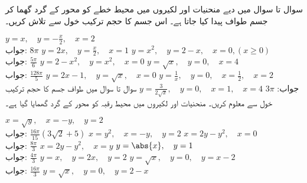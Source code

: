 سوال  تا سوال  میں دیے منحنیات اور لکیروں میں محیط خطے کو  محور کے گرد گھما کر جسم طواف پیدا کیا جاتا ہے۔ اس جسم کا حجم ترکیب خول سے تلاش کریں۔

$y=x,\quad y=-\tfrac{x}{2},\quad x=2$\\
جواب:\quad
$8\pi$
$y=2x,\quad y=\tfrac{x}{2},\quad x=1$
$y=x^2,\quad y=2-x,\quad x=0, (x\ge 0)$\\
جواب:\quad
$\tfrac{5\pi}{6}$
$y=2-x^2,\quad y=x^2,\quad x=0$
$y=\sqrt{x},\quad y=0,\quad x=4$\\
جواب:\quad
$\tfrac{128\pi}{5}$
$y=2x-1,\quad y=\sqrt{x},\quad x=0$
$y=\tfrac{1}{x},\quad y=0,\quad x=\tfrac{1}{2},\quad x=2$\\
جواب:\quad
$3\pi$
$y=\tfrac{3}{2\sqrt{x}},\quad y=0,\quad x=1,\quad x=4$
سوال  تا سوال  میں طواف جسم کا حجم ترکیب خول سے معلوم کریں۔ منحنیات اور لکیروں میں محیط رقبہ کو  محور کے گرد گھمایا گیا ہے۔

$x=\sqrt{y},\quad x=-y,\quad y=2$\\
جواب:\quad
$\tfrac{16\pi}{15}(3\sqrt{2}+5)$
$x=y^2,\quad x=-y,\quad y=2$
$x=2y-y^2,\quad x=0$\\
جواب:\quad
$\tfrac{8\pi}{3}$
$x=2y-y^2,\quad x=y$
$y=\abs{x},\quad y=1$\\
جواب:\quad
$\tfrac{4\pi}{3}$
$y=x,\quad y=2x,\quad y=2$
$y=\sqrt{x},\quad y=0,\quad y=x-2$\\
جواب:\quad
$\tfrac{16\pi}{3}$
$y=\sqrt{x},\quad y=0,\quad y=2-x$

